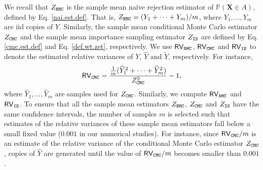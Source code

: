 \documentclass[pdflatex, sn-mathphys-ay]{sn-jnl}%
\renewcommand{\v}[1]{\boldsymbol{#1}}
\newcommand{\pp}{\mathbb{P}}
\newcommand{\mX}{\v{X}}
\newcommand{\wt}{\widetilde}
\newcommand{\wh}{\widehat}
\theoremstyle{thmstyleone}%
\theoremstyle{thmstyletwo}%
\theoremstyle{thmstylethree}%
\begin{document}
We recall that $Z_{\tt NMC}$ is the sample mean na\"{i}ve rejection estimator of $\pp(\mX \in A)$, defined by Eq. \eqref{nai.est.def}. That is, $Z_{\tt NMC} = (Y_1+ \cdots + Y_m)/m$, where $Y_1, \dots, Y_m$ are iid copies of $Y$. Similarly, the sample mean conditional Monte Carlo estimator $Z_{\tt CMC}$ and the sample mean importance sampling estimator $Z_{\tt IS}$ are defined by Eq. \eqref{cmc.est.def} and Eq. \eqref{def.wt.zet}, respectively. We use $\mathsf{RV}_{\tt NMC}$, ${\sf RV}_{\tt CMC}$ and ${\sf RV}_{\tt IS}$ to denote the estimated relative variances of $Y$, $\wh Y$ and $\wt Y$, respectively. For instance, 
\[
{\sf RV}_{\tt CMC} = \frac{\frac{1}{m}(\wh Y_1^2+ \cdots + \wh Y_m^2)}{Z^2_{\tt CMC}} -1,
\]
where $\wh Y_1, \dots, \wh Y_m$ are samples used for $Z_{\tt CMC}$. Similarly, we compute ${\sf RV}_{\tt NMC}$ and ${\sf RV}_{\tt IS}$. To ensure that all the sample mean estimators $Z_{\tt NMC}$, $Z_{\tt CMC}$ and $Z_{\tt IS}$ have the same confidence intervals, the number of samples $m$ is selected such that estimates of the relative variances of these sample mean estimators fall below a small fixed value ($0.001$ in our numerical studies). For instance, since ${\sf RV}_{\tt CMC}/m$ is an estimate of the relative variance of the conditional Monte Carlo estimator $Z_{\tt CMC}$, copies of $\wh Y$ are generated until the value of ${\sf RV}_{\tt CMC}/m$ becomes smaller than $0.001$.
\end{document}

